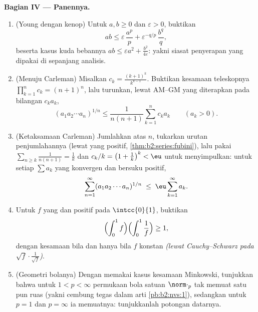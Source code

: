 \begin{problem}
\medskip
\noindent\textbf{Bagian IV --- Panennya.}
\begin{enumerate}[resume]
  \item (Young dengan kenop) Untuk $a, b \geq 0$ dan $\varepsilon >
        0$, buktikan
        \[
        ab \leq \varepsilon\,\frac{a^p}{p} +
        \varepsilon^{-q/p}\,\frac{b^q}{q},
        \]
        beserta kasus kuda bebannya $ab \leq \varepsilon a^2 +
        \frac{b^2}{4\varepsilon}$: yakni siasat penyerapan yang dipakai
        di sepanjang analisis.
  \item (Menuju Carleman) Misalkan $c_k = \frac{(k+1)^k}{k^{k-1}}$.
        Buktikan kesamaan teleskopnya $\prod_{k=1}^{n}c_k =
        (n+1)^n$, lalu turunkan, lewat AM--GM yang diterapkan pada
        bilangan $c_ka_k$,
        \[
        (a_1a_2\cdots a_n)^{1/n} \leq
        \frac{1}{n(n+1)}\sum_{k=1}^{n} c_k a_k
        \qquad (a_k > 0).
        \]
  \item (Ketaksamaan Carleman) Jumlahkan atas $n$, tukarkan
        urutan penjumlahannya (lewat  yang positif,
        \cref{thm:b2:series:fubini}), lalu pakai $\sum_{n \geq
        k}\frac{1}{n(n+1)} = \frac1k$ dan $c_k/k = \bigl(1 +
        \frac1k\bigr)^k < \eu$ untuk menyimpulkan: untuk setiap
        $\sum a_k$ yang konvergen dan bersuku positif,
        \[
        \sum_{n=1}^{\infty}(a_1a_2\cdots a_n)^{1/n}
        \;\leq\; \eu\sum_{k=1}^{\infty}a_k .
        \]
  \item Untuk $f$ yang  dan positif pada $\intcc{0}{1}$, buktikan
        \[
        \Bigl(\int_0^1 f\Bigr)\Bigl(\int_0^1\frac1f\Bigr)
        \geq 1,
        \]
        dengan kesamaan bila dan hanya bila $f$ konstan
        \emph{(lewat Cauchy--Schwarz pada $\sqrt f\cdot\frac1{\sqrt
        f}$)}.
  \item (Geometri bolanya) Dengan memakai kasus kesamaan
        Minkowski, tunjukkan bahwa untuk $1 < p < \infty$ permukaan
        bola satuan $\norm\cdot_p$ tak memuat satu pun ruas (yakni
         cembung tegas dalam arti
        \cref{pb:b2:nvs:1}), sedangkan untuk $p = 1$ dan $p =
        \infty$ ia memuatnya: tunjukkanlah potongan datarnya.
\end{enumerate}


\end{problem}
